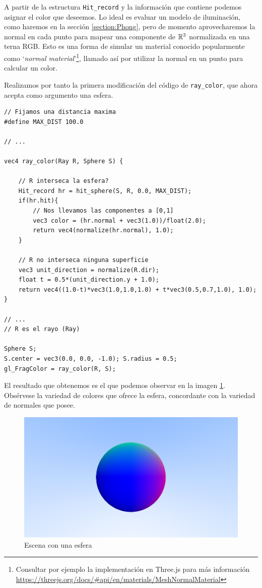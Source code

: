 A partir de la estructura \verb|Hit_record| y la información que contiene podemos asignar el color que deseemos. Lo ideal es evaluar un modelo de iluminación, como haremos en la sección \ref{section:Phong}, pero de momento aprovecharemos la normal en cada punto para mapear una componente de $\mathbb{R}^3$ normalizada en una terna RGB. Esto es una forma de simular un material conocido popularmente como `\textit{normal material}'\footnote{Consultar por ejemplo la implementación en Three.js para más información \url{https://threejs.org/docs/\#api/en/materials/MeshNormalMaterial}}, llamado así por utilizar la normal en un punto para calcular un color.

Realizamos por tanto la primera modificación del código de \verb|ray_color|, que ahora acepta como argumento una esfera.

\begin{lstlisting}
// Fijamos una distancia maxima
#define MAX_DIST 100.0

// ... 

vec4 ray_color(Ray R, Sphere S) {

    // R interseca la esfera?
    Hit_record hr = hit_sphere(S, R, 0.0, MAX_DIST);
    if(hr.hit){
        // Nos llevamos las componentes a [0,1]
        vec3 color = (hr.normal + vec3(1.0))/float(2.0);
        return vec4(normalize(hr.normal), 1.0);
    }

    // R no interseca ninguna superficie
    vec3 unit_direction = normalize(R.dir);
    float t = 0.5*(unit_direction.y + 1.0);
    return vec4((1.0-t)*vec3(1.0,1.0,1.0) + t*vec3(0.5,0.7,1.0), 1.0);
}

// ... 
// R es el rayo (Ray)

Sphere S; 
S.center = vec3(0.0, 0.0, -1.0); S.radius = 0.5;
gl_FragColor = ray_color(R, S);
\end{lstlisting}

El resultado que obtenemos es el que podemos observar en la imagen \ref{fig:una-esfera}. Obsérvese la variedad de colores que ofrece la esfera, concordante con la variedad de normales que posee.

\begin{figure} [ht]
    \centering
    \includegraphics[scale = 0.3]{img/C8/esfera_renderizada.png}
    \caption{Escena con una esfera}
    \label{fig:una-esfera}
\end{figure}

